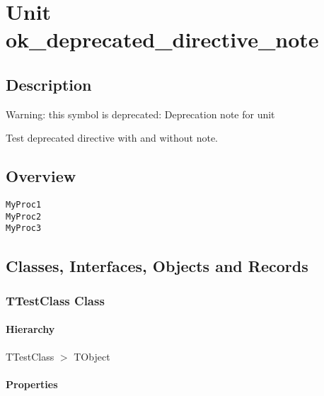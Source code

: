 \documentclass{report}
\begin{document}
\newlength{\tmplength}
\chapter{Unit ok{\_}deprecated{\_}directive{\_}note}
\section{Description}
Warning: this symbol is deprecated: Deprecation note for unit

Test deprecated directive with and without note.
\section{Overview}
\begin{description}
\item[\texttt{\begin{ttfamily}TTestClass\end{ttfamily} Class}]
\item[\texttt{\begin{ttfamily}TTestClassDeprecated1\end{ttfamily} Class}]
\item[\texttt{\begin{ttfamily}TTestClassDeprecated2\end{ttfamily} Class}]
\end{description}
\begin{description}
\item[\texttt{MyProc1}]
\item[\texttt{MyProc2}]
\item[\texttt{MyProc3}]
\end{description}
\section{Classes, Interfaces, Objects and Records}
\subsection*{TTestClass Class}
\subsubsection*{\large{\textbf{Hierarchy}}\normalsize\hspace{1ex}\hfill}
TTestClass {$>$} TObject
\subsubsection*{\large{\textbf{Properties}}\normalsize\hspace{1ex}\hfill}
\end{document}

